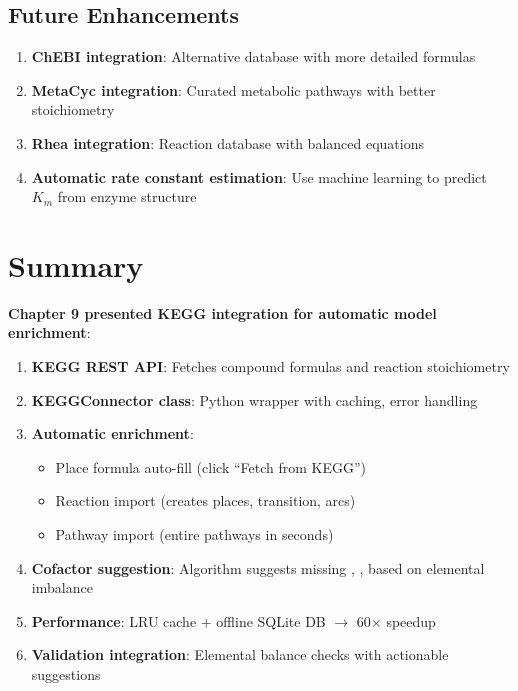 \subsection{Future Enhancements}
\label{subsec:kegg-future-enhancements}

\begin{enumerate}
    \item \textbf{ChEBI integration}: Alternative database with more detailed formulas
    \item \textbf{MetaCyc integration}: Curated metabolic pathways with better stoichiometry
    \item \textbf{Rhea integration}: Reaction database with balanced equations
    \item \textbf{Automatic rate constant estimation}: Use machine learning to predict $K_m$ from enzyme structure
\end{enumerate}

\section{Summary}
\label{sec:kegg-summary}

\textbf{Chapter 9 presented KEGG integration for automatic model enrichment}:

\begin{enumerate}
    \item \textbf{KEGG REST API}: Fetches compound formulas and reaction stoichiometry
    \item \textbf{KEGGConnector class}: Python wrapper with caching, error handling
    \item \textbf{Automatic enrichment}:
    \begin{itemize}
        \item Place formula auto-fill (click ``Fetch from KEGG'')
        \item Reaction import (creates places, transition, arcs)
        \item Pathway import (entire pathways in seconds)
    \end{itemize}
    \item \textbf{Cofactor suggestion}: Algorithm suggests missing , ,  based on elemental imbalance
    \item \textbf{Performance}: LRU cache + offline SQLite DB $\to$ 60$\times$ speedup
    \item \textbf{Validation integration}: Elemental balance checks with actionable suggestions
\end{enumerate}

